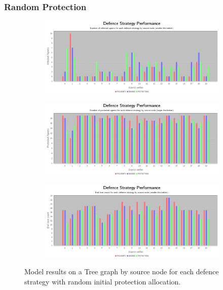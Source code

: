 \documentclass[results.tex]{subfiles}
\begin{document}
\newpage 


\subsubsection{Random Protection}



\newpage

\begin{figure}[!ht]
\centering
     \begin{subfigure}[b]{0.9\textwidth}
         \centering
         \includegraphics[width=\textwidth]{Random/RandomInfectedChart}
         \label{fig:tree-ran-infected}
     \end{subfigure}
     \vfill
     \begin{subfigure}[b]{0.9\textwidth}
         \centering
         \includegraphics[width=\textwidth]{Random/RandomProtectedChart}
         \label{fig:tree-ran-protected}
     \end{subfigure}
     \vfill
     \begin{subfigure}[b]{0.9\textwidth}
         \centering
         \includegraphics[width=\textwidth]{Random/RandomEndTurnChart}
         \label{fig:tree-ran-end}
     \end{subfigure}
        \caption{Model results on a Tree graph by source node for each defence strategy with random initial protection allocation.}
        \label{fig:tree-ran-charts}
\end{figure}
\end{document}
